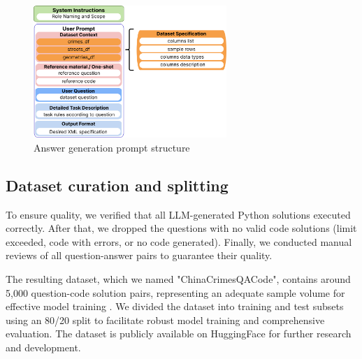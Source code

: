 \begin{figure}[H]
  \centering
  \includegraphics[width=0.65\textwidth]{images/answer_gen.png}
  \caption{Answer generation prompt structure}
  \label{fig:answer_generation_prompt_structure}
\end{figure}


\subsection{Dataset curation and splitting}

To ensure quality, we verified that all LLM-generated Python solutions executed correctly. After that, we dropped the questions with no valid code solutions (limit exceeded, code with errors, or no code generated). Finally, we conducted manual reviews of all question-answer pairs to guarantee their quality.

The resulting dataset, which we named "ChinaCrimesQACode", contains around 5,000 question-code solution pairs, representing an adequate sample volume for effective model training \citep{Unsloth2024Dataset1}. We divided the dataset into training and test subsets using an 80/20 split to facilitate robust model training and comprehensive evaluation. The dataset is publicly available on HuggingFace for further research and development.  %



